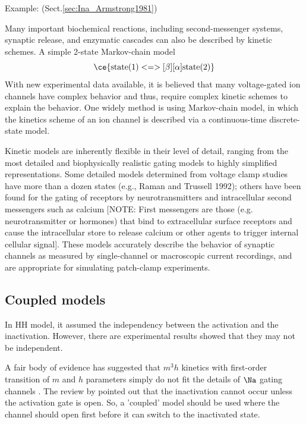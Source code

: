 Example: \citep{armstrong1981} (Sect.\ref{sec:Ina_Armstrong1981})


Many important biochemical reactions, including second-messenger
systems, synaptic release, and enzymatic cascades can also be
described by kinetic schemes.  A simple 2-state Markov-chain model
\begin{equation}
  \label{eq:827}
  \ce{\text{state(1)} <=>[\beta][\alpha] \text{state(2)}}
\end{equation}
With new experimental data available, it is believed that many
voltage-gated ion channels have complex behavior and thus, require
complex kinetic schemes to explain the behavior. One widely method is
using Markov-chain model, in which the kinetics scheme of an ion
channel is described via a continuous-time discrete-state model.


Kinetic models are inherently flexible in their level of detail, ranging from
the most detailed and biophysically realistic gating models to highly simplified
representations. Some detailed models determined from voltage clamp studies have
more than a dozen states (e.g., Raman and Trussell 1992); others have been found
for the gating of receptors by neurotransmitters and intracellular second
messengers such as calcium [NOTE: First messengers are those (e.g.
neurotransmitter or hormones) that bind to extracellular surface receptors and
cause the intracellular store to release calcium or other agents to trigger
internal cellular signal].
These models accurately describe the behavior of synaptic channels as measured
by single-channel or macroscopic current recordings, and are appropriate for
simulating patch-clamp experiments.

\subsection{Coupled models}
\label{sec:coupled-models}

In HH model, it assumed the independency between the activation and the
inactivation.  However, there are experimental results showed that they may not
be independent.

A fair body of evidence has suggested that $m^3h$ kinetics with first-order
transition of $m$ and $h$ parameters simply do not fit the details of $\Na$
gating channels \citep{hille1978ice}. The review by \citep{armstrong1981}
pointed out that the inactivation cannot occur unless the activation gate is
open. So, a 'coupled' model should be used \citep{goldman1972, hoyt1965,
hoyt1971} where the channel should open first before it can switch to the
inactivated state.

